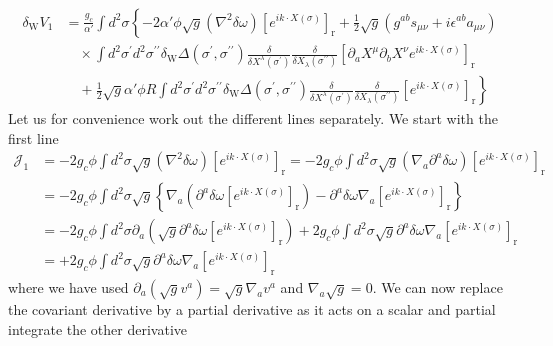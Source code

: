 \begin{tcolorbox}[breakable]
		\begin{align}
			\delta_{\mathrm{W}} V_1 &= \frac{g_c}{\alpha'} \int d^2 \sigma\left\{-2 \alpha' \phi \sqrt{g}\left(\nabla^2 \delta \omega\right)\left[e^{i k \cdot X(\sigma)}\right]_{\mathrm{r}}\right. + \frac{1}{2} \sqrt{g}\left(g^{a b} s_{\mu \nu}+i \epsilon^{a b} a_{\mu \nu}\right)\nonumber \\
			&\quad \times  \int d^2 \sigma^{\prime} d^2 \sigma^{\prime \prime} \delta_{\mathrm{W}} \Delta\left(\sigma^{\prime}, \sigma^{\prime \prime}\right)\frac{\delta}{\delta X^\lambda\left(\sigma^{\prime}\right)} \frac{\delta}{\delta X_\lambda\left(\sigma^{\prime \prime}\right)}\left[\partial_a X^\mu \partial_b X^\nu e^{i k \cdot X(\sigma)}\right]_{\mathrm{r}} \nonumber \\
			&\left.\quad + \frac{1}{2} \sqrt{g} \alpha' \phi R \int d^2 \sigma^{\prime} d^2 \sigma^{\prime \prime} \delta_{\mathrm{W}} \Delta\left(\sigma^{\prime}, \sigma^{\prime \prime}\right) \frac{\delta}{\delta X^\lambda\left(\sigma^{\prime}\right)} \frac{\delta}{\delta X_\lambda\left(\sigma^{\prime \prime}\right)}\left[e^{i k \cdot X(\sigma)}\right]_{\mathrm{r}}\right\}\label{3.175}
		\end{align}
		Let us for convenience work out the different lines separately. We start with the first line
		\begin{align}
			\mathcal{J}_1 &= -2 g_c \phi \int d^2 \sigma \sqrt{g}\left(\nabla^2 \delta \omega\right)\left[e^{i k \cdot X(\sigma)}\right]_{\mathrm{r}} = -2 g_c \phi \int d^2 \sigma \sqrt{g}\left(\nabla_a \partial^a \delta \omega\right)\left[e^{i k \cdot X(\sigma)}\right]_{\mathrm{r}} \nonumber \\
			&= -2 g_c \phi \int d^2 \sigma \sqrt{g}\left\{\nabla_a\left(\partial^a \delta \omega\left[e^{i k \cdot X(\sigma)}\right]_{\mathrm{r}}\right) - \partial^a \delta \omega \nabla_a\left[e^{i k \cdot X(\sigma)}\right]_{\mathrm{r}}\right\} \nonumber \\
			&= -2 g_c \phi \int d^2 \sigma \partial_a\left(\sqrt{g} \partial^a \delta \omega\left[e^{i k \cdot X(\sigma)}\right]_{\mathrm{r}}\right) + 2 g_c \phi \int d^2 \sigma \sqrt{g} \partial^a \delta \omega \nabla_a\left[e^{i k \cdot X(\sigma)}\right]_{\mathrm{r}} \nonumber \\
			&= + 2 g_c \phi \int d^2 \sigma \sqrt{g} \partial^a \delta \omega \nabla_a\left[e^{i k \cdot X(\sigma)}\right]_{\mathrm{r}}
		\end{align}
		where we have used $\partial_a(\sqrt{g} v^a) = \sqrt{g} \nabla_a v^a$ and $\nabla_a \sqrt{g} = 0$. We can now replace the covariant derivative by a partial derivative as it acts on a scalar and partial integrate the other derivative

\end{tcolorbox}
